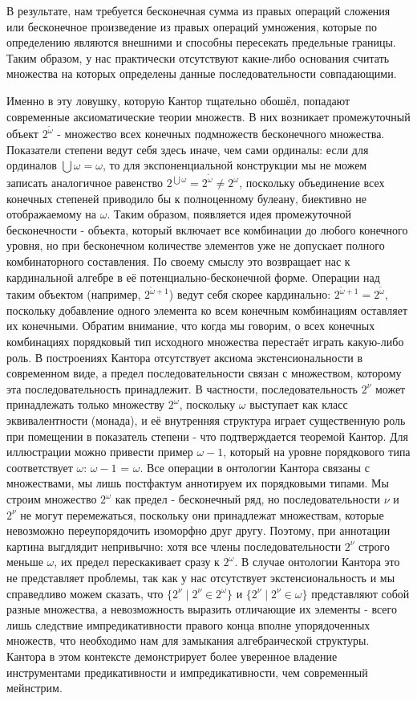 \documentclass[12pt]{article}
\begin{document}
В результате, нам требуется бесконечная сумма из правых операций сложения или бесконечное произведение из правых операций умножения, которые по определению являются внешними и способны пересекать предельные границы. Таким образом, у нас практически отсутствуют какие-либо основания считать множества на которых определены данные последовательности совпадающими.

Именно в эту ловушку, которую Кантор тщательно обошёл, попадают современные аксиоматические теории множеств. В них возникает промежуточный объект $2^{\tilde{\omega}}$ - множество всех конечных подмножеств бесконечного множества. Показатели степени ведут себя здесь иначе, чем сами ординалы: если для ординалов $\bigcup \omega = \omega$, то для экспоненциальной конструкции мы не можем записать аналогичное равенство $2^{\bigcup \omega} = 2^{\tilde{\omega}} \neq 2^\omega$, поскольку объединение всех конечных степеней приводило бы к полноценному булеану, биективно не отображаемому на $\omega$. Таким образом, появляется идея промежуточной бесконечности - объекта, который включает все комбинации до любого конечного уровня, но при бесконечном количестве элементов уже не допускает полного комбинаторного составления. По своему смыслу это возвращает нас к кардинальной алгебре в её потенциально-бесконечной форме. Операции над таким объектом (например, $2^{\tilde{\omega} + 1}$) ведут себя скорее кардинально: $2^{\tilde{\omega} + 1} = 2^{\tilde{\omega}}$, поскольку добавление одного элемента ко всем конечным комбинациям оставляет их конечными. Обратим внимание, что когда мы говорим, о всех конечных комбинациях порядковый тип исходного множества перестаёт играть какую-либо роль. В построениях Кантора отсутствует аксиома экстенсиональности в современном виде, а предел последовательности связан с множеством, которому эта последовательность принадлежит. В частности, последовательность $2^\nu$ может принадлежать только множеству $2^\omega$, поскольку $\omega$ выступает как класс эквивалентности (монада), и её внутренняя структура играет существенную роль при помещении в показатель степени - что подтверждается теоремой Кантор. Для иллюстрации можно привести пример $\omega - 1$, который на уровне порядкового типа соответствует $\omega$: $\omega - 1$ = $\omega$. Все операции в онтологии Кантора связаны с множествами, мы лишь постфактум аннотируем их порядковыми типами. Мы строим множество $2^\omega$ как предел - бесконечный ряд, но последовательности $\nu$ и $2^{\nu}$ не могут перемежаться, поскольку они принадлежат множествам, которые невозможно переупорядочить изоморфно друг другу. Поэтому, при аннотации картина выгдлядит непривычно: хотя все члены последовательности $2^\nu$ строго меньше $\omega$, их предел перескакивает сразу к $2^\omega$. В случае онтологии Кантора это не представляет проблемы, так как у нас отсутствует экстенсиональность и мы справедливо можем сказать, что $\{2^\nu \mid 2^\nu \in 2^\omega\}$ и $\{2^\nu \mid 2^\nu \in \omega\}$ представляют собой разные множества, а невозможность выразить отличающие их элементы - всего лишь следствие импредикативности правого конца вполне упорядоченных множеств, что необходимо нам для замыкания алгебраической структуры. Кантора в этом контексте демонстрирует более уверенное владение инструментами предикативности и импредикативности, чем современный мейнстрим. 
\end{document}
